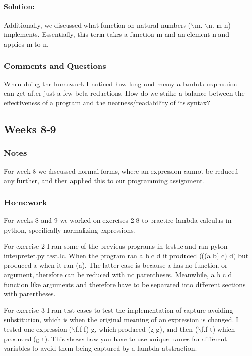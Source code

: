 \documentclass{article}
\theoremstyle{theorem}
\theoremstyle{definition}
\theoremstyle{remark}
\begin{document}
\paragraph{Solution:} 

\hspace{0.65cm}Additionally, we discussed what function on natural numbers ($\backslash$m. $\backslash$n. m n) implements. Essentially, this term takes a function m and an element n and applies m to n.

\subsubsection{Comments and Questions}
When doing the homework I noticed how long and messy a lambda expression can get after just a few beta reductions. How do we strike a balance between the effectiveness of a program and the neatness/readability of its syntax? 

\subsection{Weeks 8-9}

\subsubsection{Notes}
For week 8 we discussed normal forms, where an expression cannot be reduced any further, and then applied this to our programming assignment.

\subsubsection{Homework}
For weeks 8 and 9 we worked on exercises 2-8 to practice lambda calculus in python, specifically normalizing expressions.

\hspace{0.65cm}For exercise 2 I ran some of the previous programs in test.lc and ran pyton interpreter.py test.lc. When the program ran a b c d it produced (((a b) c) d) but produced a when it ran (a). The latter case 
is because a has no function or argument, therefore can be reduced with no parentheses. Meanwhile, a b c d 
function like arguments and therefore have to be separated into different sections with parentheses.

\hspace{0.65cm}For exercise 3 I ran test cases to test the implementation of capture avoiding substitution, which is when the original meaning
of an expression is changed. I tested one expression ($\backslash$f.f f) g, which produced (g g), and then 
($\backslash$f.f t) which produced (g t). This shows how you have to use unique names for different variables to avoid them
being captured by a lambda abstraction.
\end{document}
